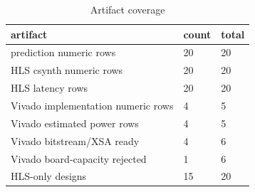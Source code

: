 \begin{table}[t]
\centering
\scriptsize
\setlength{\tabcolsep}{3pt}
\begin{tabular}{lll}
\hline
artifact & count & total \\
\hline
prediction numeric rows & 20 & 20 \\
HLS csynth numeric rows & 20 & 20 \\
HLS latency rows & 20 & 20 \\
Vivado implementation numeric rows & 4 & 5 \\
Vivado estimated power rows & 4 & 5 \\
Vivado bitstream/XSA ready & 4 & 6 \\
Vivado board-capacity rejected & 1 & 6 \\
HLS-only designs & 15 & 20 \\
\hline
\end{tabular}
\caption{Artifact coverage}
\label{tab:table\_1\_artifact\_coverage}
\end{table}
